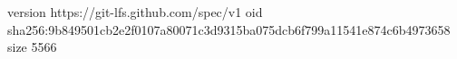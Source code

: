 version https://git-lfs.github.com/spec/v1
oid sha256:9b849501cb2e2f0107a80071c3d9315ba075dcb6f799a11541e874c6b4973658
size 5566
